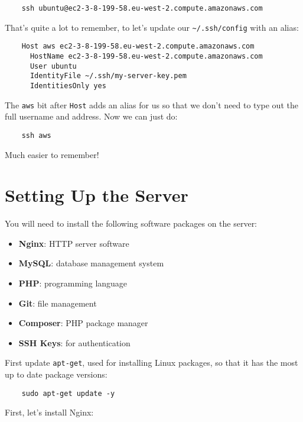 \begin{verbatim}
    ssh ubuntu@ec2-3-8-199-58.eu-west-2.compute.amazonaws.com
\end{verbatim}

That's quite a lot to remember, to let's update our \texttt{\textasciitilde/.ssh/config} with an alias:

\begin{verbatim}
    Host aws ec2-3-8-199-58.eu-west-2.compute.amazonaws.com
      HostName ec2-3-8-199-58.eu-west-2.compute.amazonaws.com
      User ubuntu
      IdentityFile ~/.ssh/my-server-key.pem
      IdentitiesOnly yes
\end{verbatim}

The \texttt{aws} bit after \texttt{Host} adds an alias for us so that we don't need to type out the full username and address. Now we can just do:

\begin{verbatim}
    ssh aws
\end{verbatim}

Much easier to remember!



\section{Setting Up the Server}

You will need to install the following software packages on the server:

\begin{itemize}
    \item \textbf{Nginx}: HTTP server software
    \item \textbf{MySQL}: database management system
    \item \textbf{PHP}: programming language
    \item \textbf{Git}: file management
    \item \textbf{Composer}: PHP package manager
    \item \textbf{SSH Keys}: for authentication
\end{itemize}

First update \texttt{apt-get}, used for installing Linux packages, so that it has the most up to date package versions:

\begin{verbatim}
    sudo apt-get update -y
\end{verbatim}

First, let's install Nginx:

